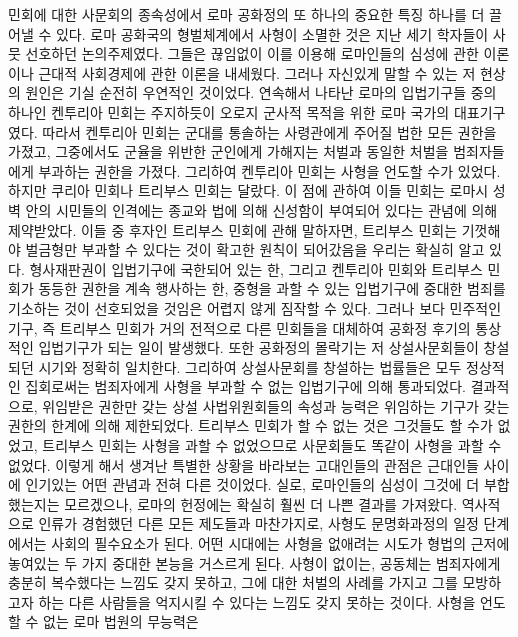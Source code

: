 민회에 대한 사문회의 종속성에서
로마 공화정의 또 하나의 중요한 특징 하나를 더
끌어낼 수 있다.
로마 공화국의 형벌체계에서 사형이 소멸한 것은
지난 세기 학자들이 사뭇 선호하던 논의주제였다.
그들은 끊임없이 이를 이용해
로마인들의 심성에 관한 이론이나
근대적 사회경제에 관한 이론을 내세웠다.
그러나 자신있게 말할 수 있는 저 현상의 원인은
기실 순전히 우연적인 것이었다.
연속해서 나타난 로마의 입법기구들 중의 하나인
켄투리아 민회는 주지하듯이
오로지 군사적 목적을 위한 로마 국가의 대표기구였다.
따라서 켄투리아 민회는
군대를 통솔하는 사령관에게 주어질 법한 모든 권한을 가졌고,
그중에서도
군율을 위반한 군인에게 가해지는 처벌과 동일한 처벌을 범죄자들에게
부과하는 권한을 가졌다.
그리하여 켄투리아 민회는 사형을 언도할 수가 있었다.
하지만 쿠리아 민회나
트리부스 민회는 달랐다.
이 점에 관하여 이들 민회는
로마시 성벽 안의 시민들의 인격에는
종교와 법에 의해
신성함이 부여되어 있다는 관념에 의해 제약받았다.
이들 중 후자인 트리부스 민회에 관해 말하자면,
트리부스 민회는 기껏해야 벌금형만 부과할 수 있다는 것이
확고한 원칙이 되어갔음을 우리는 확실히 알고 있다.
형사재판권이 입법기구에 국한되어 있는 한,
그리고 켄투리아 민회와 트리부스 민회가
동등한 권한을 계속 행사하는 한,
중형을 과할 수 있는 입법기구에
중대한 범죄를
기소하는 것이
선호되었을 것임은 어렵지 않게 짐작할 수 있다.
그러나
보다 민주적인 기구, 즉 트리부스 민회가
거의 전적으로 다른 민회들을 대체하여
공화정 후기의 통상적인 입법기구가 되는 일이 발생했다.
또한
공화정의 몰락기는
저 상설사문회들이 창설되던 시기와 정확히 일치한다.
그리하여
상설사문회를 창설하는 법률들은 모두
정상적인 집회로써는
범죄자에게 사형을 부과할 수 없는 입법기구에 의해 통과되었다.
결과적으로,
위임받은 권한만 갖는
상설 사법위원회들의
속성과 능력은
위임하는 기구가 갖는 권한의 한계에 의해 제한되었다.
트리부스 민회가 할 수 없는 것은
그것들도 할 수가 없었고,
트리부스 민회는 사형을 과할 수 없었으므로
사문회들도 똑같이 사형을 과할 수 없었다.
이렇게 해서 생겨난 특별한 상황을 바라보는
고대인들의 관점은
근대인들 사이에 인기있는 어떤 관념과 전혀 다른 것이었다.
실로,
로마인들의 심성이 그것에 더 부합했는지는 모르겠으나,
로마의 헌정에는 확실히 훨씬 더 나쁜 결과를 가져왔다.
역사적으로 인류가 경험했던 다른 모든 제도들과 마찬가지로,
사형도 문명화과정의 일정 단계에서는 사회의 필수요소가 된다.
어떤 시대에는
사형을 없애려는 시도가
형법의 근저에 놓여있는 두 가지 중대한 본능을 거스르게 된다.
사형이 없이는,
공동체는 범죄자에게 충분히 복수했다는 느낌도 갖지 못하고,
그에 대한 처벌의 사례를 가지고
그를 모방하고자 하는 다른 사람들을 억지시킬 수 있다는 느낌도
갖지 못하는 것이다.
사형을 언도할 수 없는 로마 법원의 무능력은
